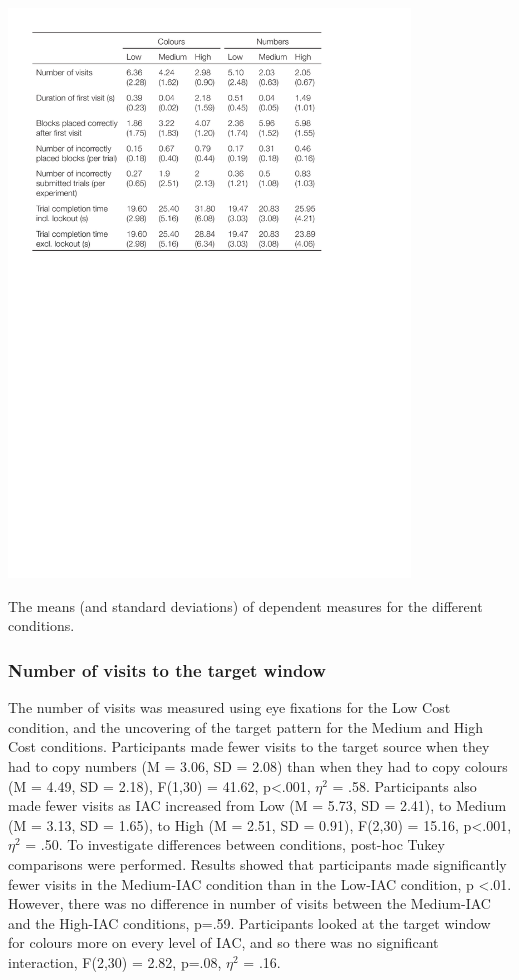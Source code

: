 \begin{table}
\centering
\includegraphics[width=0.8\textwidth]{images/ch34/ch34-3_Means.pdf}
\caption[Study 3 descriptive measures]{The means (and standard deviations) of dependent measures for the different conditions.}
\label{table:ch4_IACmeans}
\end{table}

\subsubsection{Number of visits to the target window}
The number of visits was measured using eye fixations for the Low Cost condition, and the uncovering of the target pattern for the Medium and High Cost conditions. Participants made fewer visits to the target source when they had to copy numbers (M = 3.06, SD = 2.08) than when they had to copy colours (M = 4.49, SD = 2.18), F(1,30) = 41.62, p<.001, $\eta^2$  = .58. Participants also made fewer visits as IAC increased from Low (M = 5.73, SD = 2.41), to Medium (M = 3.13, SD = 1.65), to High (M = 2.51, SD = 0.91), F(2,30) = 15.16, p<.001, $\eta^2$  = .50. To investigate differences between conditions, post-hoc Tukey comparisons were performed. Results showed that participants made significantly fewer visits in the Medium-IAC condition than in the Low-IAC condition, p <.01. However, there was no difference in number of visits between the Medium-IAC and the High-IAC conditions, p=.59. Participants looked at the target window for colours more on every level of IAC, and so there was no significant interaction, F(2,30) = 2.82, p=.08, $\eta^2$  = .16. 

